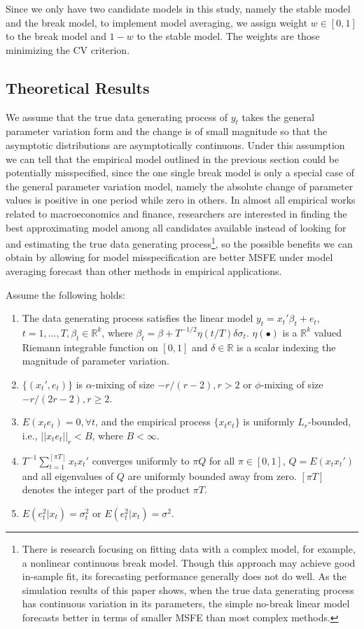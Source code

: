 \documentclass[a4paper,12pt]{article}
\begin{document}
Since we only have two candidate models in this study, namely the stable model and the break model, to implement model averaging, we assign weight $w \in [0,1]$ to the break model and $1 - w$ to the stable model. The weights are those minimizing the CV criterion.
\subsection{Theoretical Results}
We assume that the true data generating process of $y_t$ takes the general parameter variation form and the change is of small magnitude so that the asymptotic distributions are asymptotically continuous. Under this assumption we can tell that the empirical model outlined in the previous section could be potentially misspecified, since the one single break model is only a special case of the general parameter variation model, namely the absolute change of parameter values is positive in one period while zero in others. In almost all empirical works related to macroeconomics and finance, researchers are interested in finding the best approximating model among all candidates available instead of looking for and estimating the true data generating process\footnote{There is research focusing on fitting data with a complex model, for example, a nonlinear continuous break model. Though this approach may achieve good in-sample fit, its forecasting performance generally does not do well. As the simulation results of this paper shows, when the true data generating process has continuous variation in its parameters, the simple no-break linear model forecasts better in terms of smaller MSFE than most complex methods.}, so the possible benefits we can obtain by allowing for model misspecification are better MSFE under model averaging forecast than other methods in empirical applications.
\begin{Assumption}\label{asump:1}
Assume the following holds:
\begin{enumerate}
	\item The data generating process satisfies the linear model $y_t = x_t'\beta_t + e_t$, $t=1,...,T,\beta_t \in \mathbb{R}^k$, where $\beta_t = \beta + T^{-1/2}\eta(t/T)\delta\sigma_t$. $\eta(\bullet)$ is a $\mathbb{R}^k$ valued Riemann integrable function on $[0,1]$ and $\delta \in \mathbb{R}$ is a scalar indexing the magnitude of parameter variation.
	\item $\{(x_t',e_t)\}$ is $\alpha$-mixing of size $-r/(r-2),r > 2$ or $\phi$-mixing of size $-r/(2r-2),r \geq 2$.
	\item $E(x_t e_t) = 0, \forall t$, and the empirical process $\{x_t e_t\}$ is uniformly $L_r$-bounded, i.e., $||x_t e_t||_{r} < B$, where $B < \infty$.
	\item $T^{-1}\sum_{t=1}^{[\pi T]}x_t x_t'$ converges uniformly to $\pi Q$ for all $\pi \in [0,1]$, $Q = E(x_t x_t')$ and all eigenvalues of $Q$ are uniformly bounded away from zero. $[\pi T]$ denotes the integer part of the product $\pi T$.
	\item $E(e_t^{2}|x_t) = \sigma_t^{2}$ or $E(e_t^{2}|x_t) = \sigma^{2}$.
\end{enumerate}
\end{Assumption}
\end{document}
